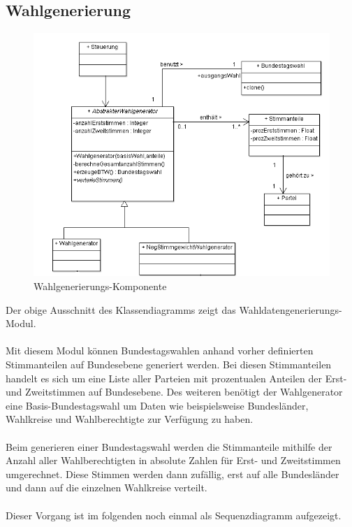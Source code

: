 \documentclass[12pt,a4paper,titlepage]{article}
\begin{document}
\subsection{Wahlgenerierung}
\begin{figure}[!ht]
\includegraphics[scale=1.0]{Klassendiagramme/Wahlgenerator_Klassendiagramm.png} \caption{Wahlgenerierungs-Komponente} 
\end{figure}

Der obige Ausschnitt des Klassendiagramms zeigt das Wahldatengenerierungs-Modul.\\\\
Mit diesem Modul können Bundestagswahlen anhand vorher definierten Stimmanteilen auf Bundesebene generiert werden. Bei diesen Stimmanteilen handelt es sich um eine Liste aller Parteien mit prozentualen Anteilen der Erst- und Zweitstimmen auf Bundesebene. Des weiteren benötigt der Wahlgenerator eine Basis-Bundestagswahl um Daten wie beispielsweise Bundesländer, Wahlkreise und Wahlberechtigte zur Verfügung zu haben.\\\\
Beim generieren einer Bundestagswahl werden die Stimmanteile mithilfe der Anzahl aller Wahlberechtigten in absolute Zahlen für Erst- und Zweitstimmen umgerechnet. Diese Stimmen werden dann zufällig, erst auf alle Bundesländer und dann auf die einzelnen Wahlkreise verteilt.\\\\
Dieser Vorgang ist im folgenden noch einmal als Sequenzdiagramm aufgezeigt.\\\\
\end{document}
